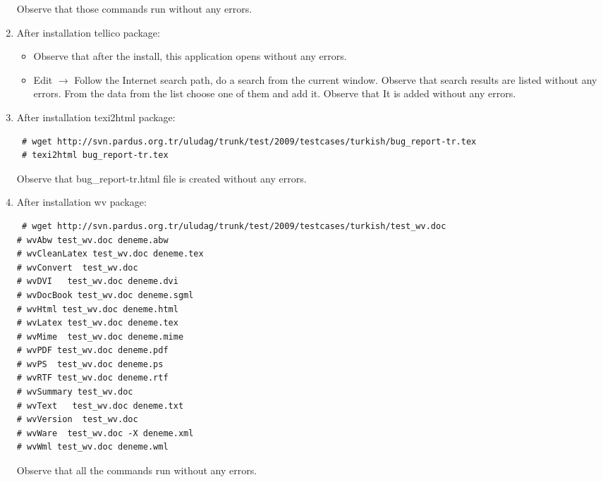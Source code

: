 \documentclass[a4paper,10pt]{article}
\begin{document}
\begin{enumerate}
Observe that those commands run without any errors. 
\item After installation tellico package:


\begin{itemize}
 \item Observe that after the install, this application opens without any errors.
 \item Edit $\rightarrow$ Follow the Internet search path, do a search from the current window. Observe that search results are listed without any errors. From the data from the list choose one of them and add it. Observe that It is added without any errors.
\end{itemize}

\item After installation  texi2html package:
\begin{verbatim}
 # wget http://svn.pardus.org.tr/uludag/trunk/test/2009/testcases/turkish/bug_report-tr.tex
 # texi2html bug_report-tr.tex
\end{verbatim}

Observe that bug\_report-tr.html file is created without any errors.

\item After installation wv package:
\begin{verbatim}
 # wget http://svn.pardus.org.tr/uludag/trunk/test/2009/testcases/turkish/test_wv.doc
# wvAbw test_wv.doc deneme.abw                                
# wvCleanLatex test_wv.doc deneme.tex                            
# wvConvert  test_wv.doc                              
# wvDVI   test_wv.doc deneme.dvi                                
# wvDocBook test_wv.doc deneme.sgml                               
# wvHtml test_wv.doc deneme.html                                 
# wvLatex test_wv.doc deneme.tex                                
# wvMime  test_wv.doc deneme.mime                                
# wvPDF test_wv.doc deneme.pdf                                  
# wvPS  test_wv.doc deneme.ps                                  
# wvRTF test_wv.doc deneme.rtf                                  
# wvSummary test_wv.doc            
# wvText   test_wv.doc deneme.txt                               
# wvVersion  test_wv.doc                             
# wvWare  test_wv.doc -X deneme.xml                                
# wvWml test_wv.doc deneme.wml       

\end{verbatim}

Observe that all the commands run without any errors.


\end{enumerate}
\end{document}
